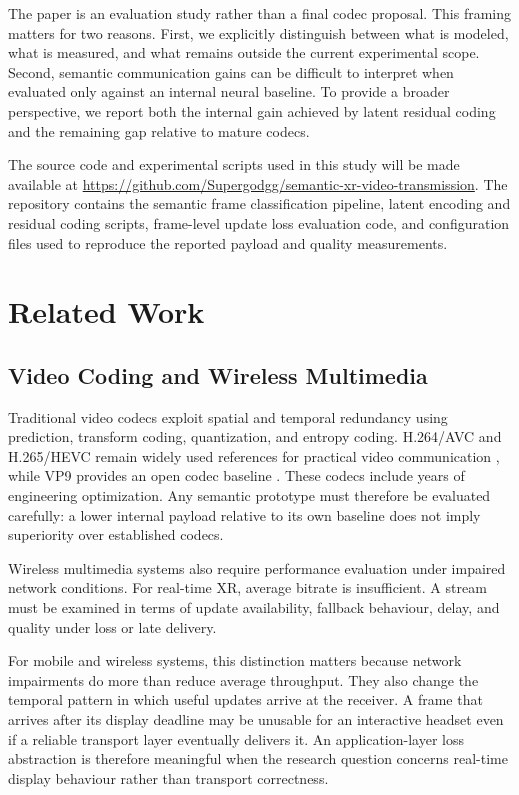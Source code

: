 \documentclass[conference]{IEEEtran}
\begin{document}
The paper is an evaluation study rather than a final codec proposal. This framing matters for two reasons. First, we explicitly distinguish between what is modeled, what is measured, and what remains outside the current experimental scope. Second, semantic communication gains can be difficult to interpret when evaluated only against an internal neural baseline. To provide a broader perspective, we report both the internal gain achieved by latent residual coding and the remaining gap relative to mature codecs.

The source code and experimental scripts used in this study will be made available at \url{https://github.com/Supergodgg/semantic-xr-video-transmission}. The repository contains the semantic frame classification pipeline, latent encoding and residual coding scripts, frame-level update loss evaluation code, and configuration files used to reproduce the reported payload and quality measurements.


\section{Related Work}

\subsection{Video Coding and Wireless Multimedia}

Traditional video codecs exploit spatial and temporal redundancy using prediction, transform coding, quantization, and entropy coding. H.264/AVC and H.265/HEVC remain widely used references for practical video communication \cite{wiegand2003overview,sullivan2012overview}, while VP9 provides an open codec baseline \cite{mukherjee2015vp9}. These codecs include years of engineering optimization. Any semantic prototype must therefore be evaluated carefully: a lower internal payload relative to its own baseline does not imply superiority over established codecs.

Wireless multimedia systems also require performance evaluation under impaired network conditions. For real-time XR, average bitrate is insufficient. A stream must be examined in terms of update availability, fallback behaviour, delay, and quality under loss or late delivery.

For mobile and wireless systems, this distinction matters because network impairments do more than reduce average throughput. They also change the temporal pattern in which useful updates arrive at the receiver. A frame that arrives after its display deadline may be unusable for an interactive headset even if a reliable transport layer eventually delivers it. An application-layer loss abstraction is therefore meaningful when the research question concerns real-time display behaviour rather than transport correctness.
\end{document}
